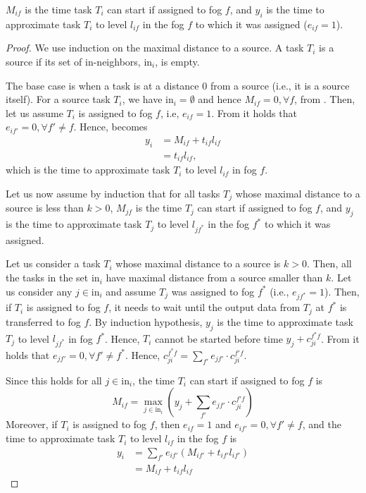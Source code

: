\begin{lemma}
$M_{if}$ is the time task $T_i$ can start if assigned to fog $f$, and
$y_i$ is the time to approximate task $T_i$ to level $l_{if}$ in the fog $f$ to which it was assigned ($e_{if}=1$).
\end{lemma}
\begin{proof}
We use induction on the maximal distance to a source. A task $T_i$ is a source if its set of in-neighbors, $\text{in}_i$, is empty. 

The base case is when a task is at a distance $0$ from a source (i.e., it is a source itself). For a source task $T_i$, we have $\text{in}_i = \emptyset$ and hence $M_{if}=0, \forall f$, from . 
Then, let us assume $T_i$ is assigned to fog $f$, i.e, $e_{if}=1$. From  it holds that $e_{if'}=0, \forall f' \neq f$. Hence,  becomes
\begin{align}
    y_i &= M_{if} + t_{if} l_{if}\\ 
    &= t_{if} l_{if},
\end{align}
which is the time to approximate task $T_i$ to level $l_{if}$ in fog $f$.

Let us now assume by induction that for all tasks $T_j$ whose maximal distance to a source is less than $k>0$, $M_{jf}$ is the time $T_j$ can start if assigned to fog $f$, and $y_j$ is the time to approximate task $T_j$ to level $l_{jf^*}$ in the fog $f^*$ to which it was assigned.

Let us consider a task $T_i$ whose maximal distance to a source is $k>0$. Then, all the tasks in the set $\text{in}_i$ have maximal distance from a source smaller than $k$. Let us consider any $j \in \text{in}_i$ and assume $T_j$ was assigned to fog $f^*$ (i.e., $e_{jf^*}=1$). Then, if $T_i$ is assigned to fog $f$, it needs to wait until the output data from $T_j$ at $f^*$ is transferred to fog $f$. By induction hypothesis, $y_j$ is the time to approximate task $T_j$ to level $l_{jf^*}$ in fog $f^*$. Hence,  $T_i$ cannot be started before time 
$y_j + c_{ji}^{f^*f}$. From  it holds that $e_{jf'}=0, \forall f' \neq f^*$. Hence, $c_{ji}^{f^*f} = \sum_{f'} e_{jf'}  \cdot c_{ji}^{f'f}$.

Since this holds for all $j \in \text{in}_i$, the time $T_i$ can start if assigned to fog $f$ is
$$
M_{if} = \max_{j \in \text{in}_i} \left( y_j + \sum_{f'} e_{jf'}  \cdot c_{ji}^{f'f} \right)
$$
Moreover, if $T_i$ is assigned to fog $f$, then $e_{if}=1$ and $e_{if'}=0, \forall f' \neq f$, and the time to approximate task $T_i$ to level $l_{if}$ in the fog $f$ is
\begin{align}
    y_i &= \sum_{f'} e_{if'} \left( M_{if'} + t_{if'} l_{if'} \right) \\
    &= M_{if} + t_{if} l_{if}
\end{align}
\end{proof}

